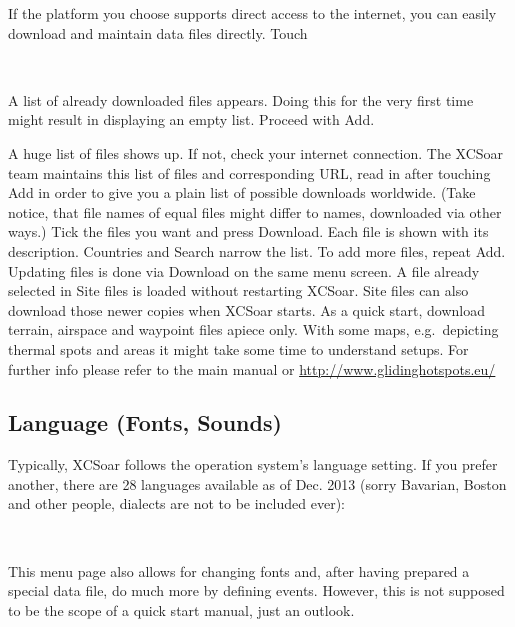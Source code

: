 \documentclass[english,a4paper,12pt]{refrep}
\renewcommand{\config}[3]{\bmenut{Config}{#1/3}{\LARGE$\triangleright$}~\bmenut{#2}{#3}}%
\begin{document}
If the platform you choose supports direct access to the internet, you can 
easily download and maintain data files directly. Touch 

\begin{flushleft}\hspace*{1cm}\config{2}{File}{Manager}\\\end{flushleft}
A list of already downloaded files appears.  Doing this for the very first 
time might result in displaying an empty list. Proceed with \blink Add.

A huge list of files shows up. If not, check your internet connection. The XCSoar
team maintains this list of files and corresponding URL, read in after
touching \blink Add in order to give you a plain list of possible downloads 
worldwide. (Take notice, that file names of equal files might differ to names, 
downloaded via other ways.)
Tick the files you want and press \blink Download. Each file is shown
with its description. Countries and Search narrow the list. To add more files, repeat 
\blink Add.
Updating files is done via \blink Download on the same menu screen.  A file
already selected in Site files is loaded without restarting XCSoar.
Site files can also download those newer copies when XCSoar starts.
As a 
quick start, download terrain, airspace and waypoint files apiece only. With 
some maps, e.g.\ depicting thermal spots and areas it might take some time to
understand setups. For further info please refer to the main manual or 
\url{http://www.glidinghotspots.eu/} 

\subsection{\textcolor{flashblue}{Language (Fonts, Sounds)}}
Typically, XCSoar follows the operation system's language setting. If you
prefer another, there are 28 languages available as of Dec. 2013 (sorry
Bavarian, Boston and other people, dialects are not to be included ever):

\begin{flushleft}\hspace*{1cm}\config{2}{System}{}\blink{}\blink
{}\\\end{flushleft}

This menu page also allows for changing fonts and, after having prepared a
special data file, do much more by defining events.  However, this is not
supposed to be the scope of a quick start manual, just an outlook.
\end{document}
